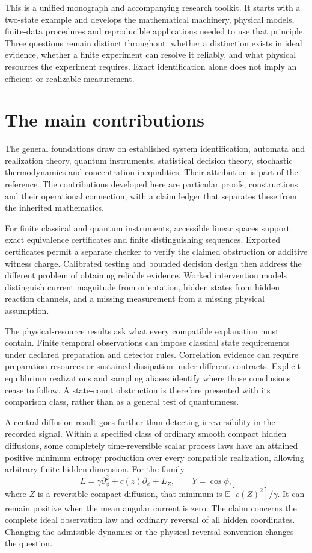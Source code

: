 \documentclass[11pt,oneside]{book}
\theoremstyle{definition}
\theoremstyle{remark}
\begin{document}
This is a unified monograph and accompanying research toolkit. It starts
with a two-state example and develops the mathematical machinery, physical
models, finite-data procedures and reproducible applications needed to use
that principle. Three questions remain distinct throughout: whether a
distinction exists in ideal evidence, whether a finite experiment can resolve
it reliably, and what physical resources the experiment requires. Exact
identification alone does not imply an efficient or realizable measurement.

\section*{The main contributions}

The general foundations draw on established system identification, automata
and realization theory, quantum instruments, statistical decision theory,
stochastic thermodynamics and concentration inequalities. Their attribution
is part of the reference. The contributions developed here are particular
proofs, constructions and their operational connection, with a claim ledger
that separates these from the inherited mathematics.

For finite classical and quantum instruments, accessible linear spaces
support exact equivalence certificates and finite distinguishing sequences.
Exported certificates permit a separate checker to verify the claimed
obstruction or additive witness charge. Calibrated testing and bounded
decision design then address the different problem of obtaining reliable
evidence. Worked intervention models distinguish current magnitude from
orientation, hidden states from hidden reaction channels, and a missing
measurement from a missing physical assumption.

The physical-resource results ask what every compatible explanation must
contain. Finite temporal observations can impose classical state requirements
under declared preparation and detector rules. Correlation evidence can
require preparation resources or sustained dissipation under different
contracts. Explicit equilibrium realizations and sampling aliases identify
where those conclusions cease to follow. A state-count obstruction is
therefore presented with its comparison class, rather than as a general
test of quantumness.

A central diffusion result goes further than detecting irreversibility in
the recorded signal. Within a specified class of ordinary smooth compact
hidden diffusions, some completely time-reversible scalar process laws have
an attained positive minimum entropy production over every compatible
realization, allowing arbitrary finite hidden dimension. For the family
\[
 L=\gamma\partial_\phi^2+c(z)\partial_\phi+L_Z,
 \qquad Y=\cos\phi,
\]
where $Z$ is a reversible compact diffusion, that minimum is
$\mathbb E[c(Z)^2]/\gamma$. It can remain positive when the mean angular
current is zero. The claim concerns the complete ideal observation law and
ordinary reversal of all hidden coordinates. Changing the admissible dynamics
or the physical reversal convention changes the question.
\end{document}
